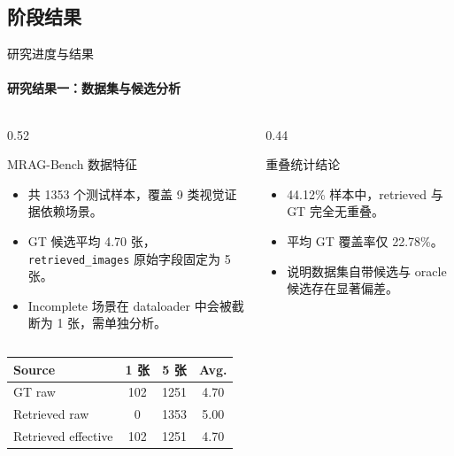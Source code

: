 \documentclass[10pt,aspectratio=169,]{beamer}
\begin{document}
\subsection{阶段结果}
\begin{frame}{研究进度与结果}
	\framesubtitle{研究结果一：数据集与候选分析}
	\begin{columns}[T]
		\begin{column}{0.52\textwidth}
			\begin{block}{MRAG-Bench 数据特征}
				\begin{itemize}
					\item 共 1353 个测试样本，覆盖 9 类视觉证据依赖场景。
					\item GT 候选平均 4.70 张，\texttt{retrieved\_images} 原始字段固定为 5 张。
					\item Incomplete 场景在 dataloader 中会被截断为 1 张，需单独分析。
				\end{itemize}
			\end{block}
		\end{column}
		\begin{column}{0.44\textwidth}
			\begin{alertblock}{重叠统计结论}
				\begin{itemize}
					\item 44.12\% 样本中，retrieved 与 GT 完全无重叠。
					\item 平均 GT 覆盖率仅 22.78\%。
					\item 说明数据集自带候选与 oracle 候选存在显著偏差。
				\end{itemize}
			\end{alertblock}
		\end{column}
	\end{columns}
	\vspace{0.4em}
	\centering
	\scriptsize
	\setlength{\tabcolsep}{7pt}
	\renewcommand{\arraystretch}{1.08}
	\begin{tabular}{lccc}
		\toprule
		Source & 1 张 & 5 张 & Avg. \\
		\midrule
		GT raw & 102 & 1251 & 4.70 \\
		Retrieved raw & 0 & 1353 & 5.00 \\
		Retrieved effective & 102 & 1251 & 4.70 \\
		\bottomrule
	\end{tabular}
\end{frame}
\end{document}
